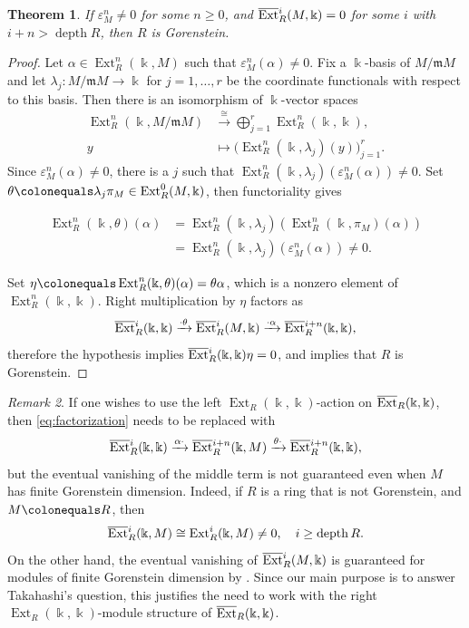 \documentclass{amsart}
\newtheorem{theorem}{Theorem}[section]
\theoremstyle{definition}
\theoremstyle{definition}
\theoremstyle{remark}
\newtheorem{remark}[theorem]{Remark}
\numberwithin{equation}{section}
\newcommand{\kk}{\Bbbk}
\newcommand{\xra}{\xrightarrow}
\newcommand{\Ext}{\operatorname{Ext}}
\newcommand{\bExt}{\overline{\operatorname{Ext}}{\vphantom E}}
\newcommand{\m}{\mathfrak{m}}
\newcommand{\depth}{\operatorname{depth}}
\begin{document}
\begin{theorem}\label{thm:Gor}
If $\varepsilon_M^n\neq0$ for some $n\geq0$, and $\bExt_R^{i}(M,\kk)=0$ for some $i$ with $i+n>\depth R$, then $R$ is Gorenstein.
\end{theorem}
\begin{proof}
Let $\alpha\in\Ext_R^n(\kk,M)$ such that $\varepsilon_M^n(\alpha)\neq0$. Fix a $\kk$-basis of $M/\m M$ and let $\lambda_j:M/\m M\rightarrow\kk$ for $j=1,\ldots,r$ be the coordinate functionals with respect to this basis. Then there is an isomorphism of $\kk$-vector spaces
\[
\begin{aligned}
\Ext_R^n(\kk,M/\m M)
&\xrightarrow{\ \cong\ }
\bigoplus_{j=1}^{r}\Ext_R^n(\kk,\kk),\\
y &\longmapsto
\bigl(\Ext_R^n(\kk,\lambda_j)(y)\bigr)_{j=1}^{r}.
\end{aligned}
\]
Since $\varepsilon_M^n(\alpha)\neq0$, there is a $j$ such that $\Ext_R^n(\kk,\lambda_j)(\varepsilon_M^n(\alpha))\neq0$. Set $\theta\colonequals \lambda_j\pi_M\in\Ext_R^0(M,\kk)$, then functoriality gives
\begin{samepage}
\begin{align*}
\Ext_R^n(\kk,\theta)(\alpha)&=\Ext_R^n(\kk,\lambda_j)(\Ext_R^n(\kk,\pi_M)(\alpha))\\
&=\Ext_R^n(\kk,\lambda_j)(\varepsilon_M^n(\alpha))\neq0.
\end{align*}
\end{samepage}
Set $\eta\colonequals\Ext_R^n(\kk,\theta)(\alpha)=\theta\alpha$, which is a nonzero element of $\Ext_R^n(\kk,\kk)$. Right multiplication by $\eta$ factors as
\begin{equation}\label{eq:factorization}
\bExt_R^i(\kk,\kk)\xra{\cdot\theta}\bExt_R^i(M,\kk)\xra{\cdot\alpha}\bExt_R^{i+n}(\kk,\kk),
\end{equation}
therefore the hypothesis implies $\bExt_R^i(\kk,\kk)\eta=0$, and  implies that $R$ is Gorenstein.
\end{proof}
\begin{remark}
If one wishes to use the left $\Ext_R(\kk,\kk)$-action on $\bExt_R(\kk,\kk)$, then \eqref{eq:factorization} needs to be replaced with 
\[
\bExt_R^i(\kk,\kk)\xra{\alpha\cdot}\bExt_R^{i+n}(\kk,M)\xra{\theta\cdot}\bExt_R^{i+n}(\kk,\kk),
\]
but the eventual vanishing of the middle term is not guaranteed even when $M$ has finite Gorenstein dimension. Indeed, if $R$ is a ring that is not Gorenstein, and $M\colonequals R$, then
\[
\bExt^i_R(\kk,M)\cong\Ext_R^i(\kk,M)\neq0,\quad i\geq\depth R.
\]
On the other hand, the eventual vanishing of $\bExt^i_R(M,\kk)$ is guaranteed for modules of finite Gorenstein dimension by . Since our main purpose is to answer Takahashi's question, this justifies the need to work with the right $\Ext_R(\kk,\kk)$-module structure of $\bExt_R(\kk,\kk)$.
\end{remark}
\end{document}
